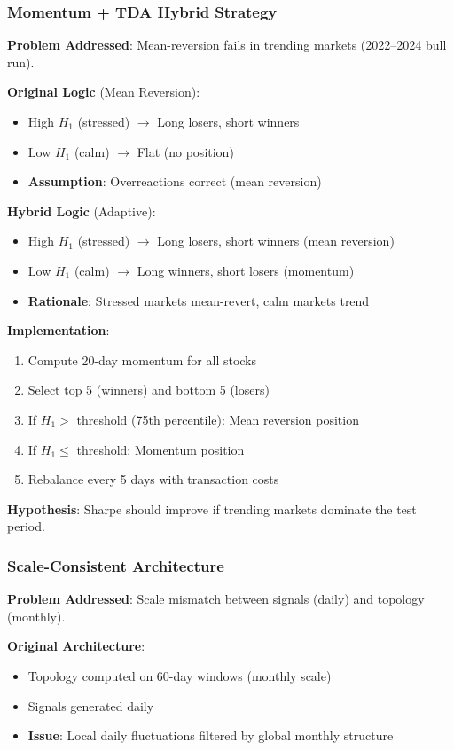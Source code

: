 \subsubsection{Momentum + TDA Hybrid Strategy}

\textbf{Problem Addressed}: Mean-reversion fails in trending markets (2022--2024 bull run).

\textbf{Original Logic} (Mean Reversion):
\begin{itemize}
\item High $H_1$ (stressed) $\rightarrow$ Long losers, short winners
\item Low $H_1$ (calm) $\rightarrow$ Flat (no position)
\item \textbf{Assumption}: Overreactions correct (mean reversion)
\end{itemize}

\textbf{Hybrid Logic} (Adaptive):
\begin{itemize}
\item High $H_1$ (stressed) $\rightarrow$ Long losers, short winners (mean reversion)
\item Low $H_1$ (calm) $\rightarrow$ Long winners, short losers (momentum)
\item \textbf{Rationale}: Stressed markets mean-revert, calm markets trend
\end{itemize}

\textbf{Implementation}:
\begin{enumerate}
\item Compute 20-day momentum for all stocks
\item Select top 5 (winners) and bottom 5 (losers)
\item If $H_1 >$ threshold (75th percentile): Mean reversion position
\item If $H_1 \leq$ threshold: Momentum position
\item Rebalance every 5 days with transaction costs
\end{enumerate}

\textbf{Hypothesis}: Sharpe should improve if trending markets dominate the test period.

\subsubsection{Scale-Consistent Architecture}

\textbf{Problem Addressed}: Scale mismatch between signals (daily) and topology (monthly).

\textbf{Original Architecture}:
\begin{itemize}
\item Topology computed on 60-day windows (monthly scale)
\item Signals generated daily
\item \textbf{Issue}: Local daily fluctuations filtered by global monthly structure
\end{itemize}

